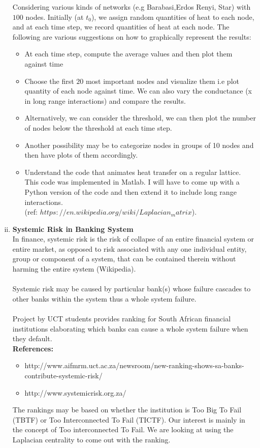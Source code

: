 \documentclass[10pt,a4paper]{article}
\begin{document}
\begin{enumerate}[i)]
Considering various kinds of networks (e.g Barabasi,Erdos Renyi, Star) with $100$ nodes. Initially (at $t_0$), we assign random quantities of heat to each node, and at each time step, we record quantities of heat at each node. The following are various suggestions on how to graphically represent the results:\\
\begin{itemize}
\item At each time step, compute the average values and then plot them against time
\item Choose the first $20$ most important nodes and visualize them i.e plot quantity of each node against time. We can also vary the conductance (x in long range interactions) and compare the results.
\item  Alternatively, we can consider the threshold, we can then plot the number of nodes below the threshold at each time step.
\item Another possibility may be to categorize nodes in groups of 10 nodes and then have plots of them accordingly.
\item Understand the code that animates heat transfer  on a regular lattice. This code was implemented in Matlab. I will have to come up with a Python version of the code and then extend it to include long range interactions.\\
(ref: $https://en.wikipedia.org/wiki/Laplacian_matrix$).  
\end{itemize}
\item \textbf{Systemic Risk in Banking System} \\

In finance, systemic risk is the risk of collapse of an entire financial system or entire market, as opposed to risk associated with any one individual entity, group or component of a system, that can be contained therein without harming the entire system (Wikipedia).\\\\
Systemic risk may be caused by particular bank(s) whose failure cascades to other banks within the system thus a whole system failure.\\\\
Project by UCT students provides ranking for South African financial institutions elaborating which banks can cause a whole system failure when they default. \\
\textbf{References:}\\
\begin{itemize}
\item http://www.aifmrm.uct.ac.za/newsroom/new-ranking-shows-sa-banks-contribute-systemic-risk/ 
\item http://www.systemicrisk.org.za/
\end{itemize}
The rankings may be based on whether the institution is Too Big To Fail (TBTF) or Too Interconnected To Fail (TICTF). Our interest is mainly in the concept of Too interconnected To Fail. We are looking at using the Laplacian centrality to come out with the ranking.\\


\end{enumerate}
\end{document}
